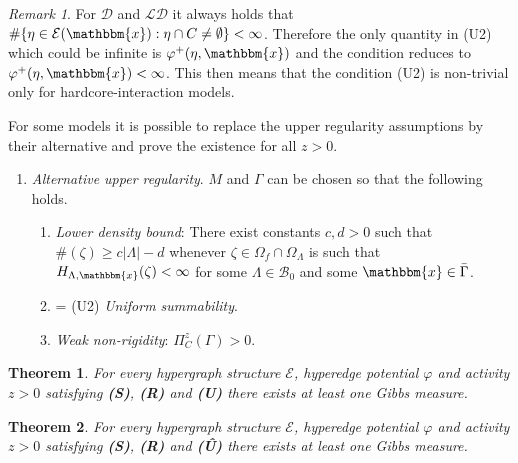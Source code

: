 \documentclass[12pt,a4paper]{article}
\newtheorem{theorem}{Theorem}
\theoremstyle{definition}
\theoremstyle{remark}
\newtheorem{remark}{Remark}
\theoremstyle{theorem}
\newcommand{\x}{\mathbbm{x}}
\begin{document}
\begin{remark}\label{r:U2}
	For $\mathcal D$ and $\mathcal {LD}$ it always holds that $\#\{\eta \in \mathcal E(\x): \eta \cap C \neq \emptyset\}<\infty$. Therefore the only quantity in (U2) which could be infinite is $\varphi^+(\eta,\x)$ and the condition reduces to $\varphi^+(\eta,\x) <  \infty$. This then means that the condition (U2) is non-trivial only for hardcore-interaction models.
\end{remark}



For some models it is possible to replace the upper regularity assumptions by their alternative and prove the existence for all $z>0$.

\begin{enumerate}[(\textbf{\^{U}})]
	\item \textit{Alternative upper regularity}. $M$ and $\Gamma$ can be chosen so that the following holds.
	\begin{enumerate}[(\^U1)]
		\item \textit{Lower density bound}: There exist constants $c,d > 0$ such that $\#(\zeta) \geq c|\Lambda| - d$ whenever $\zeta \in \Omega_f\cap \Omega_\Lambda$ is such that $H_{\Lambda,\x}(\zeta)<\infty$ for some $\Lambda \in \mathcal B_0$ and some $\x \in \bar\Gamma$.
		\item = (U2) \textit{Uniform summability}.
		\item \textit{Weak non-rigidity}: $\Pi^z_C(\Gamma) > 0$.
	\end{enumerate}
\end{enumerate}


\begin{theorem}
	For every hypergraph structure $\mathcal E$, hyperedge potential $\varphi$ and activity $z>0$ satisfying \textbf{(S)}, \textbf{(R)} and \textbf{(U)} there exists at least one Gibbs measure.
\end{theorem}

\begin{theorem}
	For every hypergraph structure $\mathcal E$, hyperedge potential $\varphi$ and activity $z>0$ satisfying \textbf{(S)}, \textbf{(R)} and \textbf{(\^{U})} there exists at least one Gibbs measure.
\end{theorem}
\end{document}
